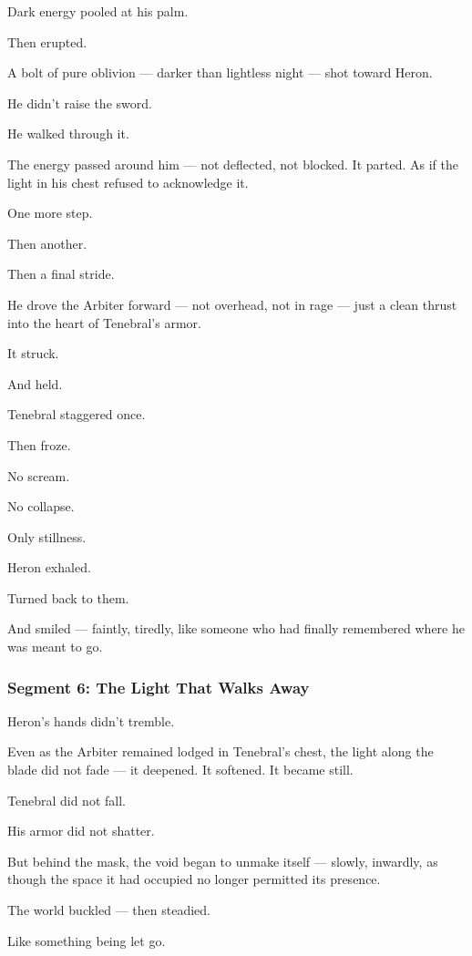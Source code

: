 \documentclass[9pt]{article}
\begin{document}
Dark energy pooled at his palm.

Then erupted.

A bolt of pure oblivion — darker than lightless night — shot toward Heron.

He didn’t raise the sword.

He walked through it.

The energy passed around him — not deflected, not blocked. It parted. As if the light in his chest refused to acknowledge it.

One more step.

Then another.

Then a final stride.

He drove the Arbiter forward — not overhead, not in rage — just a clean thrust into the heart of Tenebral’s armor.

It struck.

And held.

\bigskip

Tenebral staggered once.

Then froze.

No scream.

No collapse.

Only stillness.

Heron exhaled.

Turned back to them.

And smiled — faintly, tiredly, like someone who had finally remembered where he was meant to go.

\newpage

\subsubsection*{Segment 6: The Light That Walks Away}

Heron’s hands didn’t tremble.

Even as the Arbiter remained lodged in Tenebral’s chest, the light along the blade did not fade — it deepened. It softened. It became still.

Tenebral did not fall.

His armor did not shatter.

But behind the mask, the void began to unmake itself — slowly, inwardly, as though the space it had occupied no longer permitted its presence.

The world buckled — then steadied.

Like something being let go.

\bigskip
\end{document}
